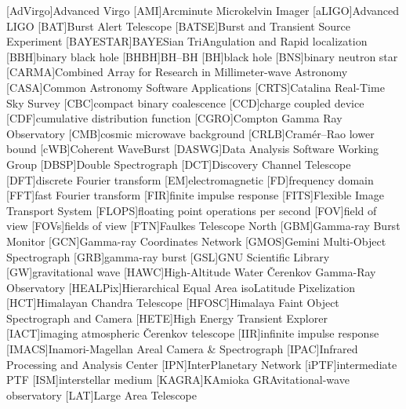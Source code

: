 \begin{acronym}
[AdVirgo]{Advanced Virgo}
[AMI]{Arcminute Microkelvin Imager}
[aLIGO]{Advanced \acs{LIGO}}
[BAT]{Burst Alert Telescope}
[BATSE]{Burst and Transient Source Experiment}
[BAYESTAR]{BAYESian TriAngulation and Rapid localization}
[BBH]{binary black hole}
[BHBH]{\acl{BH}\nobreakdashes--\acl{BH}}
[BH]{black hole}
[BNS]{binary neutron star}
[CARMA]{Combined Array for Research in Millimeter\nobreakdashes-wave Astronomy}
[CASA]{Common Astronomy Software Applications}
[CRTS]{Catalina Real-Time Sky Survey}
[CBC]{compact binary coalescence}
[CCD]{charge coupled device}
[CDF]{cumulative distribution function}
[CGRO]{Compton Gamma Ray Observatory}
[CMB]{cosmic microwave background}
[CRLB]{Cram\'{e}r\nobreakdashes--Rao lower bound}
[cWB]{Coherent WaveBurst}
[DASWG]{Data Analysis Software Working Group}
[DBSP]{Double Spectrograph}
[DCT]{Discovery Channel Telescope}
[DFT]{discrete Fourier transform}
[EM]{electromagnetic}
[FD]{frequency domain}
[FFT]{fast Fourier transform}
[FIR]{finite impulse response}
[FITS]{Flexible Image Transport System}
[FLOPS]{floating point operations per second}
[FOV]{field of view}
[FOVs]{fields of view}
[FTN]{Faulkes Telescope North}
[GBM]{Gamma-ray Burst Monitor}
[GCN]{Gamma-ray Coordinates Network}
[GMOS]{Gemini Multi-Object Spectrograph}
[GRB]{gamma-ray burst}
[GSL]{GNU Scientific Library}
[GW]{gravitational wave}
[HAWC]{High\nobreakdashes-Altitude Water \v{C}erenkov Gamma\nobreakdashes-Ray Observatory}
[HEALPix]{Hierarchical Equal Area isoLatitude Pixelization}
[HCT]{Himalayan Chandra Telescope}
[HFOSC]{Himalaya Faint Object Spectrograph and Camera}
[HETE]{High Energy Transient Explorer}
[IACT]{imaging atmospheric \v{C}erenkov telescope}
[IIR]{infinite impulse response}
[IMACS]{Inamori-Magellan Areal Camera \& Spectrograph}
[IPAC]{Infrared Processing and Analysis Center}
[IPN]{InterPlanetary Network}
[iPTF]{intermediate \acl{PTF}}
[ISM]{interstellar medium}
[KAGRA]{KAmioka GRAvitational\nobreakdashes-wave observatory}
[LAT]{Large Area Telescope}

\end{acronym}
